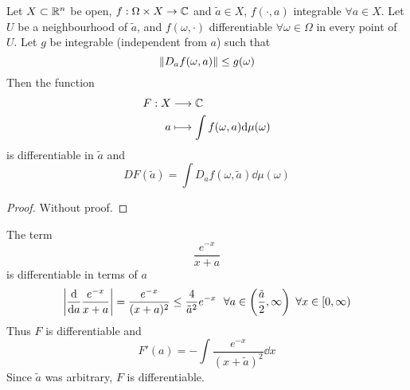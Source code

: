 \documentclass[../../script.tex]{subfiles}
\begin{document}
\begin{cor}
    Let $X \subset \mathbb{R}^n$ be open, $f: \Omega \times X \rightarrow \mathbb{C}$ and $\tilde{a} \in X$, $f(\cdot, a)$ integrable 
    $\forall a \in X$. Let $U$ be a neighbourhood of $\tilde{a}$, and $f(\omega, \cdot)$ differentiable $\forall \omega \in \Omega$ in every point of $U$.
    Let $g$ be integrable (independent from $a$) such that 
    \[
        \norm{D_a f(\omega, a)} \le g(\omega)
    \]
    Then the function 
    \begin{align*}
        F: X &\longrightarrow \mathbb{C} \\
        a &\longmapsto \int f(\omega, a) \dd\mu(\omega)
    \end{align*}
    is differentiable in $\tilde{a}$ and 
    \[
        DF(\tilde{a}) = \int D_a f(\omega, \tilde{a}) \dd\mu(\omega)
    \]
\end{cor}
\begin{proof}
    Without proof.
\end{proof}

\begin{eg}
    The term 
    \[
        \frac{e^{-x}}{x + a}
    \]
    is differentiable in terms of $a$
    \[
        \abs{\dv{a} \frac{e^{-x}}{x + a}} = \frac{e^{-x}}{(x + a)^2} \le \frac{4}{\tilde{a}^2} e^{-x} ~~\forall a \in \left(\frac{\tilde{a}}{2}, \infty\right) ~\forall x \in [0, \infty)
    \]
    Thus $F$ is differentiable and 
    \[
        F'(a) = -\int \frac{e^{-x}}{(x + \tilde{a})^2} \dd x
    \]
    Since $\tilde{a}$ was arbitrary, $F$ is differentiable.
\end{eg}
\end{document}
